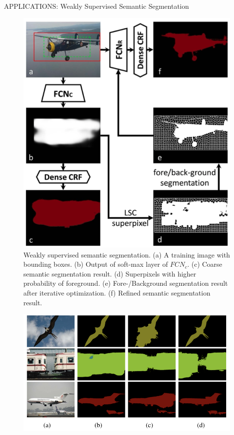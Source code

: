 \documentclass[10pt]{beamer}
\begin{document}
\begin{frame}{APPLICATIONS: Weakly Supervised Semantic Segmentation}
    \begin{minipage}{\linewidth}
        \centering
        \begin{minipage}{0.45\linewidth}
            \begin{figure}[H]
                \includegraphics[width = 0.7 \linewidth]{images/paper2/semanticSegmentation.png}
                \caption{Weakly supervised semantic segmentation. (a) A training image with bounding boxes. (b) Output of soft-max layer of $ FCN_c $. (c) Coarse semantic segmentation result. (d) Superpixels with higher probability of foreground. (e) Fore-/Background segmentation result after iterative optimization. (f) Refined semantic segmentation result.}
            \end{figure}
        \end{minipage}
        \hspace{0.05\linewidth}
        \begin{minipage}{0.45\linewidth}
            \begin{figure}[htbp]
                \centering
                \includegraphics[width = 1 \linewidth]{images/paper2/segmentationAlgo.png}

\end{figure}
\end{minipage}
\end{minipage}
\end{frame}
\end{document}

